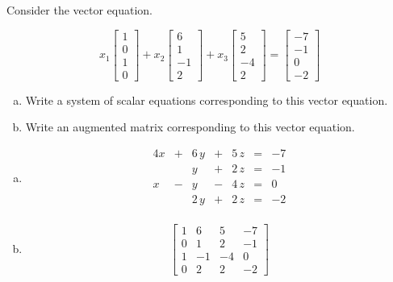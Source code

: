 
\begin{exerciseStatement}


Consider the vector equation.

\[ x_{1} \left[\begin{array}{c}
1 \\
0 \\
1 \\
0
\end{array}\right] + x_{2} \left[\begin{array}{c}
6 \\
1 \\
-1 \\
2
\end{array}\right] + x_{3} \left[\begin{array}{c}
5 \\
2 \\
-4 \\
2
\end{array}\right] = \left[\begin{array}{c}
-7 \\
-1 \\
0 \\
-2
\end{array}\right] \]
\begin{enumerate}[(a)]
\item  Write a system of scalar equations corresponding to this vector equation. 
\item  Write an augmented matrix corresponding to this vector equation. 
\end{enumerate}
    
\end{exerciseStatement}
    
\begin{exerciseAnswer} 

\begin{enumerate}[(a)]
\item 
\begin{alignat*}{4} x &+& 6 \, y &+& 5 \, z &=& -7 \\ & & y &+& 2 \, z &=& -1 \\x &-& y &-& 4 \, z &=& 0 \\ & & 2 \, y &+& 2 \, z &=& -2 \\ \end{alignat*}
            
\item \[ \left[\begin{array}{ccc|c}
1 & 6 & 5 & -7 \\
0 & 1 & 2 & -1 \\
1 & -1 & -4 & 0 \\
0 & 2 & 2 & -2
\end{array}\right] \]
\end{enumerate}
    
\end{exerciseAnswer}
    

